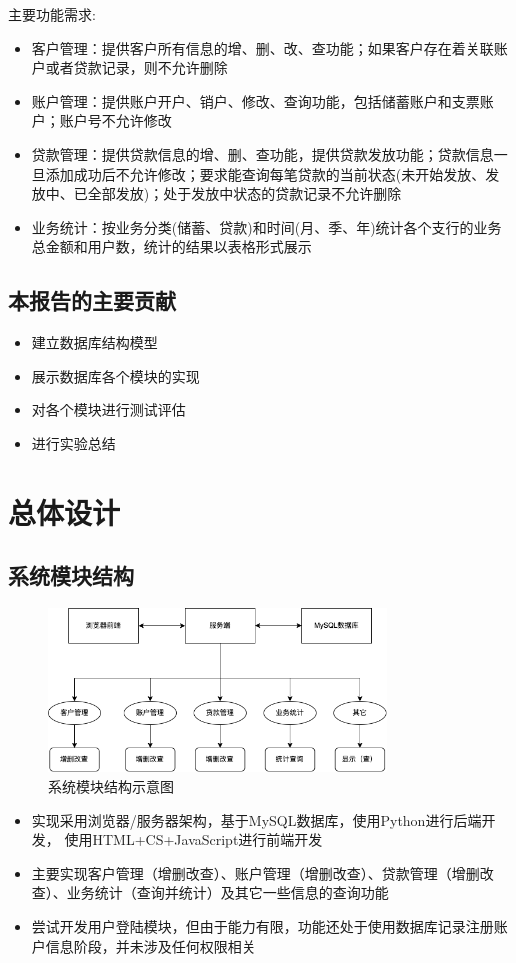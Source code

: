 \documentclass{article}
\begin{document}
    主要功能需求:
    \begin{itemize}
        \item 客户管理：提供客户所有信息的增、删、改、查功能；如果客户存在着关联账户或者贷款记录，则不允许删除
        \item 账户管理：提供账户开户、销户、修改、查询功能，包括储蓄账户和支票账户；账户号不允许修改
        \item 贷款管理：提供贷款信息的增、删、查功能，提供贷款发放功能；贷款信息一旦添加成功后不允许修改；要求能查询每笔贷款的当前状态(未开始发放、发放中、已全部发放)；处于发放中状态的贷款记录不允许删除
        \item 业务统计：按业务分类(储蓄、贷款)和时间(月、季、年)统计各个支行的业务总金额和用户数，统计的结果以表格形式展示
    \end{itemize}
    \subsection{本报告的主要贡献}
    \begin{itemize}
        \item 建立数据库结构模型
        \item 展示数据库各个模块的实现
        \item 对各个模块进行测试评估
        \item 进行实验总结
    \end{itemize}
    \section{总体设计}
    \subsection{系统模块结构}
    \begin{figure}[H]
        \centering
        \includegraphics[width=0.8\textwidth]{./fig/system_module.png}
        \caption[system_module]{系统模块结构示意图}
    \end{figure}
    \begin{itemize}
        \item 实现采用浏览器/服务器架构，基于MySQL数据库，使用Python进行后端开发，
        使用HTML+CS+JavaScript进行前端开发
        \item 主要实现客户管理（增删改查）、账户管理（增删改查）、贷款管理（增删改查）、业务统计（查询并统计）及其它一些信息的查询功能
        \item 尝试开发用户登陆模块，但由于能力有限，功能还处于使用数据库记录注册账户信息阶段，并未涉及任何权限相关
    \end{itemize}
\end{document}
